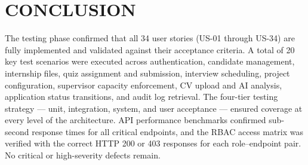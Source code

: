 \section{CONCLUSION}
The testing phase confirmed that all 34 user stories (US-01 through US-34) are fully implemented and validated against their acceptance criteria. A total of 20 key test scenarios were executed across authentication, candidate management, internship files, quiz assignment and submission, interview scheduling, project configuration, supervisor capacity enforcement, CV upload and AI analysis, application status transitions, and audit log retrieval. The four-tier testing strategy — unit, integration, system, and user acceptance — ensured coverage at every level of the architecture. API performance benchmarks confirmed sub-second response times for all critical endpoints, and the RBAC access matrix was verified with the correct HTTP 200 or 403 responses for each role--endpoint pair. No critical or high-severity defects remain.
